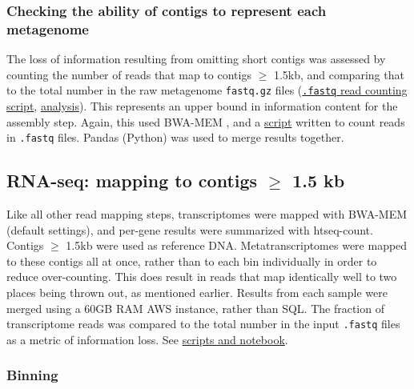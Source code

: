 \subsubsection{Checking the ability of contigs to represent each metagenome}   %
The loss of information resulting from omitting short contigs was assessed by counting the number of reads that map to contigs $\geq$ 1.5kb, and comparing that to the total number in the raw metagenome \texttt{fastq.gz} files (\href{https://github.com/BeckResearchLab/meta4/blob/master/m4b_binning/assembly/data/sample_info/count_reads_in_each_sample.sh}{\texttt{.fastq} read counting script}, \href{https://github.com/BeckResearchLab/meta4/tree/master/m4b_binning/assembly/assess_sample_mappings_to_contigs}{analysis}).
This represents an upper bound in information content for the assembly step.
Again, this used BWA-MEM \cite{li2009}, and a \href{https://github.com/BeckResearchLab/meta4/blob/master/m4b_binning/assembly/data/sample_info/count_reads_in_each_sample.sh}{script} written to count reads in \texttt{.fastq} files.
Pandas (Python) was used to merge results together.

\subsection{RNA-seq: mapping to contigs $\geq$ 1.5 kb}    %
Like all other read mapping steps, transcriptomes were mapped with BWA-MEM (default settings), and per-gene results were summarized with htseq-count.
Contigs $\geq$ 1.5kb were used as reference DNA.
Metatranscriptomes were mapped to these contigs all at once, rather than to each bin individually in order to reduce over-counting.
This does result in reads that map identically well to two places being thrown out, as mentioned earlier.
Results from each sample were merged using a 60GB RAM AWS instance, rather than SQL.
The fraction of transcriptome reads was compared to the total number in the input \texttt{.fastq} files as a metric of information loss.
See \href{https://github.com/BeckResearchLab/meta4/tree/master/rnaseq/alignments}{scripts and notebook}.

\subsubsection{Binning}    %

